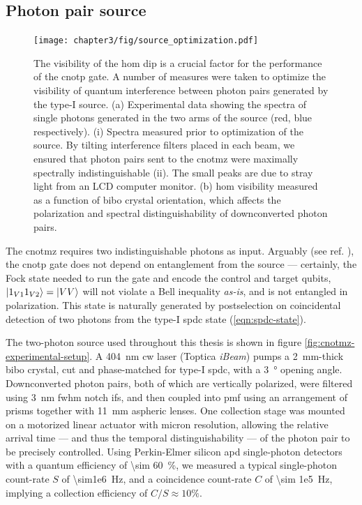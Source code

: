 \subsection{Photon pair source} 
\label{sec:cnotmz-source}
\begin{figure}[t]
\centering
\texttt{[image: chapter3/fig/source\_optimization.pdf]}
\caption[Type-I source optimization]{
The visibility of the \gls{hom} dip is a crucial factor for the performance of the \acrshort{cnotp} gate. A number of measures were taken to optimize the visibility of quantum interference between photon pairs generated by the type-I source. (a) Experimental data showing the spectra of single photons generated in the two arms of the source (red, blue respectively). (i) Spectra measured prior to optimization of the source. By tilting interference filters placed in each beam, we ensured that photon pairs sent to the \gls{cnotmz} were maximally spectrally indistinguishable (ii). The small peaks are due to stray light from an LCD computer monitor. (b) \gls{hom} visibility measured as a function of \gls{bibo} crystal orientation, which affects the polarization and spectral distinguishability of downconverted photon pairs.  }
\label{fig:source-optimization}
\end{figure}

The \gls{cnotmz} requires two indistinguishable photons as input. Arguably (see ref. \cite{Tan1991a}), the \gls{cnotp} gate does not depend on entanglement from the source --- certainly, the Fock state needed to run the gate and encode the control and target qubits, $\mbox{$ | 1_{V1} 1_{V2} \rangle $} = \mbox{$ | VV \rangle $}$ will not violate a Bell inequality \emph{as-is}, and is not entangled in polarization. This state is naturally generated by postselection on coincidental detection of two photons from the type-I \gls{spdc} state (\ref{eqn:spdc-state}).

The two-photon source used throughout this thesis
is shown in figure \ref{fig:cnotmz-experimental-setup}. A \SI{404}{\nano \metre} \gls{cw} laser (Toptica \emph{iBeam}) pumps a \SI{2}{\milli \metre}-thick \gls{bibo} crystal, cut and phase-matched for type-I \gls{spdc}, with a \SI{3}{\degree} opening angle. Downconverted photon pairs, both of which are vertically polarized, were filtered using  \SI{3}{\nano \metre} \gls{fwhm} notch \glspl{if}, and then coupled into \gls{pmf} using an arrangement of prisms together with \SI{11}{\milli\metre} aspheric lenses.  One collection stage was mounted on a motorized linear actuator with micron resolution, allowing the relative arrival time --- and thus the temporal distinguishability --- of the photon pair to be precisely controlled. Using Perkin-Elmer silicon \gls{apd} single-photon detectors with a quantum efficiency of \SI{\sim 60}{\percent}, we measured a typical single-photon count-rate $S$ of \SI{\sim1e6}{\hertz}, and a coincidence count-rate $C$ of \SI{\sim 1e5}{\hertz}, implying a collection efficiency of $C/S \approx 10\%$. 

